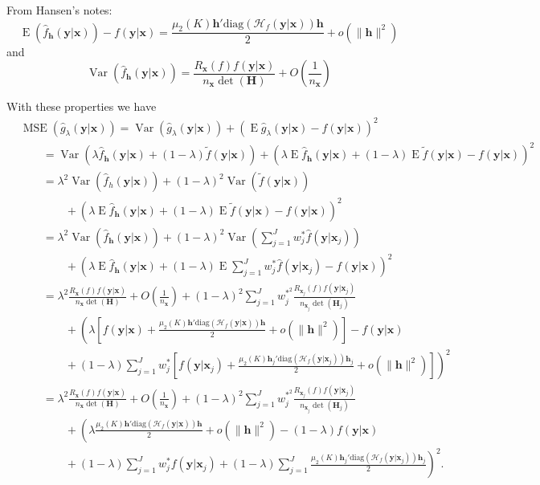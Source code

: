 \documentclass[11pt]{article}
\newcommand{\Hcal}{\mathcal{H}}
\newcommand{\Hbf}{\textbf{H}}
\newcommand{\y}{\textbf{y}}
\newcommand{\x}{\textbf{x}}
\newcommand{\h}{\textbf{h}}
\newcommand{\wstar}{w^{\textstyle{*}}}
\newcommand{\wstarsq}{w^{\textstyle{*}^2}}
\DeclareMathOperator{\E}{E}
\DeclareMathOperator{\Var}{Var}
\DeclareMathOperator{\MSE}{MSE}
\begin{document}
From Hansen's notes: 
$$
  \E(\hat f_\h(\y|\x)) - f(\y|\x) = \frac{\mu_2(K)\h'\text{diag}(\Hcal_f(\y|\x))\h}{2} 
    + o(\|\h\|^2)
$$
and
$$
 \Var(\hat f_\h(\y|\x)) = \frac{R_{\x}(f)f(\y|\x)}{n_\x\det(\Hbf)} + O\left(\frac{1}{n_\x}\right)
$$

With these properties we have
\begin{align*}
  &\MSE(\hat g_\lambda(\y|\x)) 
    = \Var\left(\hat g_\lambda(\y|\x)\right) 
    + \left(\E\hat g_\lambda(\y|\x) - f(\y|\x)\right)^2 \\
  &\qquad= \Var\left(\lambda \hat f_\h(\y|\x) + (1 - \lambda)\tilde{f}(\y|\x)\right) 
    + \left(\lambda\E\hat f_\h(\y|\x) 
    + (1 - \lambda)\E\tilde{f}(\y|\x) - f(\y|\x)\right)^2 \\
  &\qquad= \lambda^2\Var\left(\hat f_h(\y|\x)\right) 
    + (1 - \lambda)^2\Var\left(\tilde{f}(\y|\x)\right) \\
      &\qquad\qquad+ \left(\lambda\E\hat f_\h(\y|\x) 
      +  (1 - \lambda)\E\tilde{f}(\y|\x) 
      - f(\y|\x)\right)^2 \\ 
  &\qquad= \lambda^2\Var\left(\hat f_\h(\y|\x)\right) 
    + (1 - \lambda)^2\Var\left(\sum_{j=1}^J\wstar_j\hat f(\y|\x_j)\right) \\
      &\qquad\qquad+ \left(\lambda\E\hat f_\h(\y|\x) 
      + (1 - \lambda)\E\sum_{j=1}^J\wstar_j\hat f(\y|\x_j) 
      - f(\y|\x)\right)^2 \\ 
  &\qquad= \lambda^2 \frac{R_{\x}(f)f(\y|\x)}{n_\x\det(\Hbf)} + O\left(\frac{1}{n_\x}\right)
    + (1 - \lambda)^2\sum_{j=1}^J\wstarsq_j\frac{R_{\x_j}(f)f(\y|\x_j)}{n_{\x_j}\det(\Hbf_j)} \\
    &\qquad\qquad+ \left(\lambda\left[f(\y|\x) + \frac{\mu_2(K)\h'\text{diag}(\Hcal_f(\y|\x))\h}{2} 
    + o(\|\h\|^2)\right] - f(\y|\x) \right. \\
	&\qquad\qquad+ \left. 
	(1 - \lambda)\sum_{j=1}^J\wstar_j\left[f(\y|\x_j) + 
	\frac{\mu_2(K)\h_j'\text{diag}(\Hcal_f(\y|\x_j))\h_j}{2} 
    + o(\|\h\|^2)\right]\right)^2 \\
  &\qquad= \lambda^2 \frac{R_{\x}(f)f(\y|\x)}{n_\x\det(\Hbf)} + O\left(\frac{1}{n_\x}\right)
    + (1 - \lambda)^2\sum_{j=1}^J\wstarsq_j\frac{R_{\x_j}(f)f(\y|\x_j)}{n_{\x_j}\det(\Hbf_j)} \\
    &\qquad\qquad+ \left(\lambda\frac{\mu_2(K)\h'\text{diag}(\Hcal_f(\y|\x))\h}{2} 
    + o(\|\h\|^2) - (1-\lambda)f(\y|\x) \right. \\
	&\qquad\qquad+ \left. 
	(1 - \lambda)\sum_{j=1}^J\wstar_jf(\y|\x_j) + 
	(1 - \lambda)\sum_{j=1}^J\frac{\mu_2(K)\h_j'\text{diag}(\Hcal_f(\y|\x_j))\h_j}{2}\right)^2. \\    
\end{align*}
\end{document}
